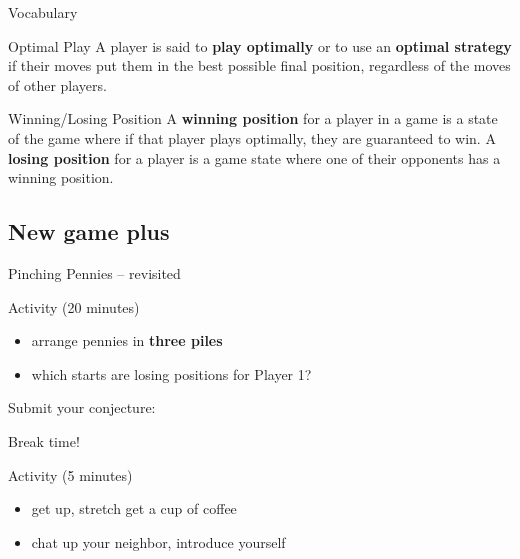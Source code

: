 \documentclass{beamer}
\begin{document}
\begin{frame}{Vocabulary}
\pause
  \begin{block}{Optimal Play}
\pause
    A player is said to \textbf{play optimally} or to use an \textbf{optimal strategy} if their moves put them in the best possible final position, regardless of the moves of other players.
  \end{block}
\pause
  \begin{block}{Winning/Losing Position}
\pause
    A \textbf{winning position} for a player in a game is a state of the game where if that player {plays optimally}, they are guaranteed to win.  A \textbf{losing position} for a player is a game state where one of their opponents has a winning position.
  \end{block}
\end{frame}

\subsection{New game plus}
\begin{frame}{Pinching Pennies -- revisited}
\pause
  \begin{block}{Activity (20 minutes)}
    \begin{itemize}
\pause
      \item arrange pennies in \textbf{three piles}
\pause
      \item which starts are losing positions for {\color{blue}Player 1}?
    \end{itemize}
  \end{block}
\pause
  \begin{block}{Submit your conjecture:}
    \begin{center}
    \end{center}
  \end{block}
\end{frame}

\begin{frame}{Break time!}
  \begin{block}{Activity (5 minutes)}
    \begin{itemize}
      \item get up, stretch get a cup of coffee
      \item chat up your neighbor, introduce yourself
    \end{itemize}
  \end{block}
\end{frame}
\end{document}
